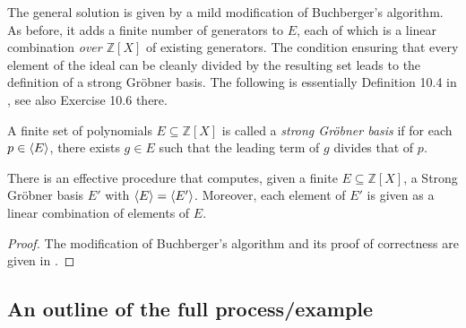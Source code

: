 \documentclass[numbers=enddot]{scrartcl}
\newcommand{\ints}{\mathbb{Z}}
\begin{document}
  The general solution is given by a mild modification of Buchberger's algorithm.
  As before, it adds a finite number of generators to $E$, each of which is a linear combination \emph{over $\ints[X]$}
  of existing generators.
  The condition ensuring that every element of the ideal
  can be cleanly divided by the resulting set leads to the definition of a strong Gr\"obner basis.
  The following is essentially Definition 10.4 in \cite{GB}, see also Exercise 10.6 there. \hired{}
  \begin{dfn}
  A finite set of polynomials $E \subseteq \ints[X]$ is called a \emph{strong Gr\"obner basis} if
  for each $p \in {\left\langle{E}\right\rangle}$, there exists $g \in E$ such that the leading term of $g$ divides that of $p$. 
\end{dfn}

\begin{thm}
  There is an effective procedure that computes, given a finite $E \subseteq \ints[X]$,
  a Strong Gr\"obner basis $E'$ with ${\left\langle{E}\right\rangle} = {\left\langle{E'}\right\rangle}$. 
  Moreover, each element of $E'$ is given as a linear combination of elements of $E$.
\end{thm}
\begin{proof} The modification of Buchberger's algorithm and its proof of correctness are 
  given in \cite[Thm.10.14]{GB}.
\end{proof}

\subsection{An outline of the full process/example}
\end{document}
